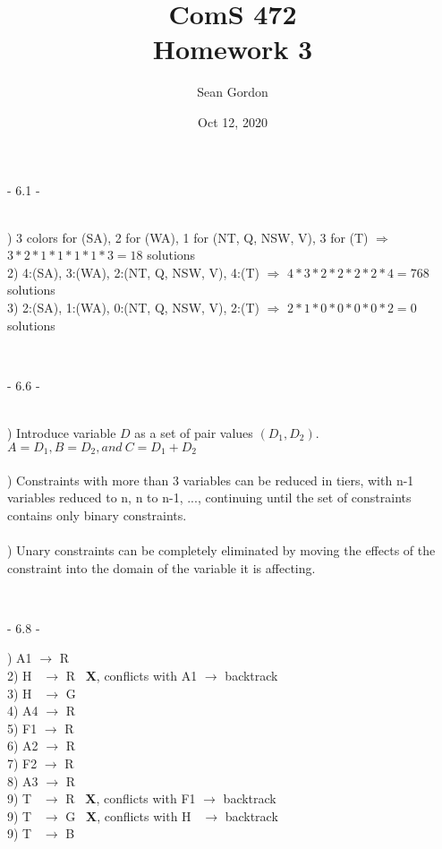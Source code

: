 \documentclass[12pt]{article}
\title{ComS 472\\Homework 3}
\author{Sean Gordon}
\date{Oct 12, 2020}
\begin{document}
\maketitle


\centerline{- 6.1 - }
\ \\
) 3 colors for (SA), 2 for (WA), 1 for (NT, Q, NSW, V), 3 for (T) $\Rightarrow$ \\\indent $3*2*1*1*1*1*3=18$ solutions\\[.4em]
2) 4:(SA), 3:(WA), 2:(NT, Q, NSW, V), 4:(T) $\Rightarrow$ $4*3*2*2*2*2*4=768$ solutions\\[.4em]
3) 2:(SA), 1:(WA), 0:(NT, Q, NSW, V), 2:(T) $\Rightarrow$ $2*1*0*0*0*0*2=0$ solutions



\noindent \hrulefill \\



\centerline{- 6.6 - }
\ \\
) Introduce variable $D$ as a set of pair values $(D_1, D_2)$. $A = D_1, B = D_2, and\ C = D_1+D_2$\\\\
) Constraints with more than 3 variables can be reduced in tiers, with n-1 variables reduced to n, n to n-1, ..., continuing until the set of constraints contains only binary constraints.\\\\
) Unary constraints can be completely eliminated by moving the effects of the constraint into the domain of the variable it is affecting.



\noindent \hrulefill \\



\centerline{- 6.8 - }
) A1 $\rightarrow$ R \ \checkmark\\
2) H \ $\rightarrow$ R \ \textbf{X}, conflicts with A1 $\rightarrow$ backtrack \\
3) H \ $\rightarrow$ G \ \checkmark\\
4) A4 $\rightarrow$ R \ \checkmark\\
5) F1 $\rightarrow$ R \ \checkmark\\
6) A2 $\rightarrow$ R \ \checkmark\\
7) F2 $\rightarrow$ R \ \checkmark\\
8) A3 $\rightarrow$ R \ \checkmark\\
9) T \ $\rightarrow$ R \ \textbf{X}, conflicts with F1 $\rightarrow$ backtrack \\
9) T \ $\rightarrow$ G \ \textbf{X}, conflicts with H \ $\rightarrow$ backtrack \\
9) T \ $\rightarrow$ B \ \checkmark\\
\end{document}
